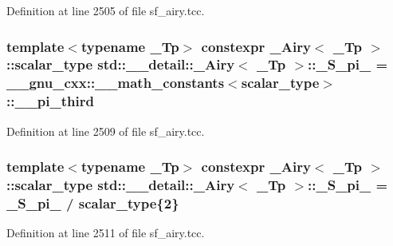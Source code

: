 Definition at line 2505 of file sf\+\_\+airy.\+tcc.

\subsubsection[{\texorpdfstring{\+\_\+\+S\+\_\+pi\+\_\+3}{_S_pi_3}}]{\setlength{\rightskip}{0pt plus 5cm}template$<$typename \+\_\+\+Tp$>$ constexpr {\bf \+\_\+\+Airy}$<$ \+\_\+\+Tp $>$\+::{\bf scalar\+\_\+type} {\bf std\+::\+\_\+\+\_\+detail\+::\+\_\+\+Airy}$<$ \+\_\+\+Tp $>$\+::\+\_\+\+S\+\_\+pi\+\_ = \+\_\+\+\_\+gnu\+\_\+cxx\+::\+\_\+\+\_\+math\+\_\+constants$<${\bf scalar\+\_\+type}$>$\+::\+\_\+\+\_\+pi\+\_\+third\hspace{0.3cm}{\ttfamily [static]}}\hypertarget{classstd_1_1____detail_1_1__Airy_a2050b1922ed0b79c5231ada9dffc77e5}{}\label{classstd_1_1____detail_1_1__Airy_a2050b1922ed0b79c5231ada9dffc77e5}


Definition at line 2509 of file sf\+\_\+airy.\+tcc.

\subsubsection[{\texorpdfstring{\+\_\+\+S\+\_\+pi\+\_\+6}{_S_pi_6}}]{\setlength{\rightskip}{0pt plus 5cm}template$<$typename \+\_\+\+Tp$>$ constexpr {\bf \+\_\+\+Airy}$<$ \+\_\+\+Tp $>$\+::{\bf scalar\+\_\+type} {\bf std\+::\+\_\+\+\_\+detail\+::\+\_\+\+Airy}$<$ \+\_\+\+Tp $>$\+::\+\_\+\+S\+\_\+pi\+\_ = {\bf \+\_\+\+S\+\_\+pi\+\_} / {\bf scalar\+\_\+type}\{2\}\hspace{0.3cm}{\ttfamily [static]}}\hypertarget{classstd_1_1____detail_1_1__Airy_ab43a77e34022fb3e772ef6504bf9319e}{}\label{classstd_1_1____detail_1_1__Airy_ab43a77e34022fb3e772ef6504bf9319e}


Definition at line 2511 of file sf\+\_\+airy.\+tcc.

